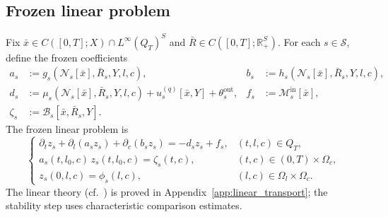 \documentclass[pdflatex,sn-mathphys-num]{sn-jnl}%
\begin{document}
\subsection{Frozen linear problem}
Fix
\(\bar x\in C([0,T];X)\cap L^\infty(Q_T)^S\) and
\(\bar R\in C([0,T];\mathbb R_+^S)\).
For each \(s\in\mathcal S\), define the frozen coefficients
\begin{align}
a_s &:=g_s(\mathcal N_s[\bar x],\bar R_s,Y,l,c), &
b_s &:=h_s(\mathcal N_s[\bar x],\bar R_s,Y,l,c), \label{eq:wp_frozen_ab}\\
d_s &:=\mu_s(\mathcal N_s[\bar x],\bar R_s,Y,l,c)
+u_s^{(q)}[\bar x,Y]+\theta_s^{\mathrm{out}}, &
f_s &:=\mathcal M_s^{\mathrm{in}}[\bar x], \label{eq:wp_frozen_df}\\
\zeta_s &:=\mathcal B_s[\bar x,\bar R_s,Y]. \label{eq:wp_frozen_zeta}
\end{align}
The frozen linear problem is
\begin{equation}\label{eq:wp_frozen_problem}
\begin{cases}
\partial_t z_s+\partial_l(a_s z_s)+\partial_c(b_s z_s)
=-d_s z_s+f_s,
& (t,l,c)\in Q_T,\\[1mm]
a_s(t,l_0,c)\,z_s(t,l_0,c)=\zeta_s(t,c),
& (t,c)\in (0,T)\times\Omega_c,\\[1mm]
z_s(0,l,c)=\phi_s(l,c),
& (l,c)\in\Omega_l\times\Omega_c.
\end{cases}
\end{equation}
The linear theory (cf.\ \cite{yu2026age,Perthame2007,engel2000one,cai2026optimal,Webb1985,magal2018theory,wang2025multi}) is proved in Appendix~\ref{app:linear_transport}; the
stability step uses characteristic comparison estimates.
\end{document}

